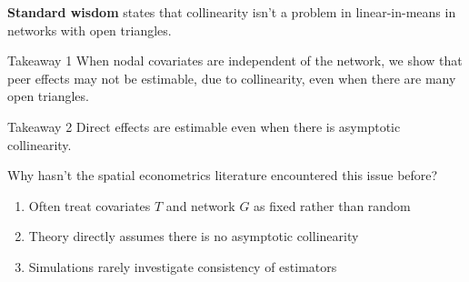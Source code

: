 \documentclass[aspectratio=169]{beamer}
\theoremstyle{remark}
\begin{document}
\begin{frame}
    \textbf{Standard wisdom} states that collinearity isn't a problem in linear-in-means in networks with open triangles.
    
    \vspace{4mm}
    
    \begin{block}{Takeaway 1}
        When nodal covariates are independent of the network, we show that peer effects may not be estimable, due to collinearity, even when there are many open triangles.
    \end{block}
    
    \vspace{4mm}
    
    \begin{block}{Takeaway 2}
        Direct effects are estimable even when there is asymptotic collinearity.
    \end{block}
\end{frame}

\begin{frame}{Why hasn't the spatial econometrics literature encountered this issue before?}
    
    \begin{enumerate}
        \item Often treat covariates $T$ and network $G$ as fixed rather than random
        \item Theory directly assumes there is no asymptotic collinearity
        \item Simulations rarely investigate consistency of estimators
    \end{enumerate}
\end{frame}
\end{document}
